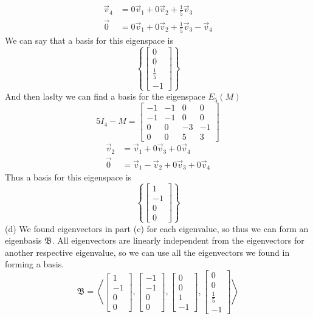 \documentclass{report}
\begin{document}
$$
\begin{aligned}
\vec{v}_4 &= 0\vec{v}_1 + 0\vec{v}_2 + \frac{1}{5}\vec{v}_3 \\
\vec{0} &= 0\vec{v}_1 + 0\vec{v}_2 + \frac{1}{5}\vec{v}_3 - \vec{v}_4
\end{aligned}
$$
We can say that a basis for this eigenspace is
$$
\left\{
\begin{bmatrix}
0\\0\\\frac{1}{5}\\-1
\end{bmatrix}
\right\}
$$
And then laslty we can find a basis for the eigenspace $E_5(M)$
$$
5I_4 - M = \begin{bmatrix}
-1&-1&0&0\\
-1&-1&0&0\\
0&0&-3&-1\\
0&0&5&3
\end{bmatrix}
$$
$$
\begin{aligned}
\vec{v}_2 & = \vec{v}_1 + 0 \vec{v}_3 + 0\vec{v}_4 \\
\vec{0} & = \vec{v}_1 - \vec{v}_2 + 0\vec{v}_3 + 0\vec{v}_4
\end{aligned}
$$
Thus a basis for this eigenspace is
$$
\left\{
\begin{bmatrix}1\\-1\\0\\0\end{bmatrix}
\right\}
$$
(d) We found eigenvectors in part (c) for each eigenvalue,  so thus we can form an eigenbasis $\mathfrak{B}$.  All eigenvectors are linearly independent from the eigenvectors for another respective eigenvalue,  so we can use all the eigenvectors we found in forming a basis.
$$
\mathfrak{B} = \left\langle
\begin{bmatrix}1\\-1\\0\\0\end{bmatrix},
\begin{bmatrix}-1\\-1\\0\\0\end{bmatrix},
\begin{bmatrix}0\\0\\1\\-1\end{bmatrix},
\begin{bmatrix}0\\0\\\frac{1}{5}\\-1\end{bmatrix}
\right\rangle
$$
\end{document}
